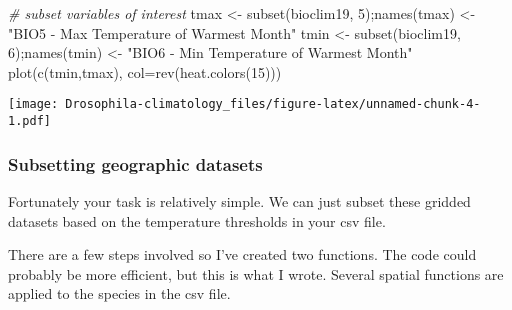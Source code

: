 \documentclass[
]{article}
\newenvironment{Shaded}{\begin{snugshade}}{\end{snugshade}}
\newcommand{\AttributeTok}[1]{\textcolor[rgb]{0.77,0.63,0.00}{#1}}
\newcommand{\CommentTok}[1]{\textcolor[rgb]{0.56,0.35,0.01}{\textit{#1}}}
\newcommand{\DecValTok}[1]{\textcolor[rgb]{0.00,0.00,0.81}{#1}}
\newcommand{\FunctionTok}[1]{\textcolor[rgb]{0.00,0.00,0.00}{#1}}
\newcommand{\NormalTok}[1]{#1}
\newcommand{\OtherTok}[1]{\textcolor[rgb]{0.56,0.35,0.01}{#1}}
\newcommand{\StringTok}[1]{\textcolor[rgb]{0.31,0.60,0.02}{#1}}
\begin{document}
\begin{Shaded}
\begin{Highlighting}[]
\CommentTok{\# subset variables of interest}
\NormalTok{tmax }\OtherTok{\textless{}{-}} \FunctionTok{subset}\NormalTok{(bioclim19, }\DecValTok{5}\NormalTok{);}\FunctionTok{names}\NormalTok{(tmax) }\OtherTok{\textless{}{-}} \StringTok{"BIO5 {-} Max Temperature of Warmest Month"}
\NormalTok{tmin }\OtherTok{\textless{}{-}} \FunctionTok{subset}\NormalTok{(bioclim19, }\DecValTok{6}\NormalTok{);}\FunctionTok{names}\NormalTok{(tmin) }\OtherTok{\textless{}{-}} \StringTok{"BIO6 {-} Min Temperature of Warmest Month"}
\FunctionTok{plot}\NormalTok{(}\FunctionTok{c}\NormalTok{(tmin,tmax), }\AttributeTok{col=}\FunctionTok{rev}\NormalTok{(}\FunctionTok{heat.colors}\NormalTok{(}\DecValTok{15}\NormalTok{)))}
\end{Highlighting}
\end{Shaded}

\texttt{[image: Drosophila-climatology\_files/figure-latex/unnamed-chunk-4-1.pdf]}

\hypertarget{subsetting-geographic-datasets}{%
\subsubsection{Subsetting geographic
datasets}\label{subsetting-geographic-datasets}}

Fortunately your task is relatively simple. We can just subset these
gridded datasets based on the temperature thresholds in your csv file.

There are a few steps involved so I've created two functions. The code
could probably be more efficient, but this is what I wrote. Several
spatial functions are applied to the species in the csv file.
\end{document}
